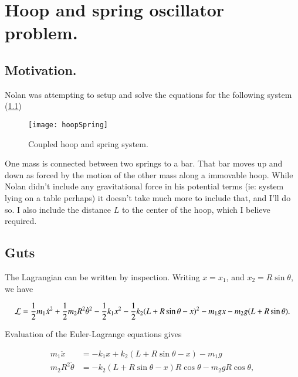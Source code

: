 %
%

\chapter{Hoop and spring oscillator problem.}
\label{chap:hoopSpring}
{}
\date{June 19, 2010}

\beginArtNoToc

\section{Motivation.}

Nolan was attempting to setup and solve the equations for the following system (\ref{fig:hoopSpring})

\begin{figure}[htp]
\centering
\texttt{[image: hoopSpring]}
\caption{Coupled hoop and spring system.}\label{fig:hoopSpring}
\end{figure}

One mass is connected between two springs to a bar.  That bar moves up and down as forced by the motion of the other mass along a immovable hoop.  While Nolan didn't include any gravitational force in his potential terms (ie: system lying on a table perhaps) it doesn't take much more to include that, and I'll do so.  I also include the distance $L$ to the center of the hoop, which I believe required.

\section{Guts}

The Lagrangian can be written by inspection.  Writing $x = x_1$, and $x_2 = R \sin\theta$, we have

\begin{align}\label{eqn:hoopSpring:1}
\mathcal{L} = 
\frac{1}{2} m_1 \dot{x}^2 
+ \frac{1}{2} m_2 R^2 \dot{\theta}^2 
- \frac{1}{2} k_1 x^2 
- \frac{1}{2} k_2 ( L + R \sin\theta - x )^2
- m_1 g x
- m_2 g ( L + R \sin\theta).
\end{align}

Evaluation of the Euler-Lagrange equations gives

\begin{subequations}
\label{eqn:hoopSpring:2}
\begin{align}
m_1 \ddot{x} &= - k_1 x + k_2 ( L + R \sin\theta - x ) - m_1 g \\
m_2 R^2 \ddot{\theta} &= - k_2 ( L + R \sin\theta - x ) R \cos\theta - m_2 g R \cos\theta,
\end{align}
\end{subequations}


